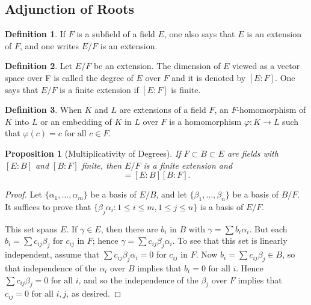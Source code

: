 \documentclass[draft]{article}
\newtheorem{prop}[thm]{Proposition}
\theoremstyle{definition}
\newtheorem{defn}{Definition}[section]
\theoremstyle{remark}
\begin{document}
		\subsection{Adjunction of Roots}
		
			\begin{defn}
				If $F$ is a subfield of a field $E$, one also says that $E$ is an extension of $F$, and one writes $E/F$ is an extension.
			\end{defn}
			
			\begin{defn}
				Let $E/F$ be an extension. The dimension of $E$ viewed as a vector space over F is called the degree of $E$ over $F$ and it is denoted by $[E : F]$. One says that $E/F$ is a finite extension if $[E : F]$ is finite.
			\end{defn}
			
			\begin{defn}
			    When $K$ and $L$ are extensions of a field $F$, an $F$-homomorphism of $K$ into $L$ or an embedding of $K$ in $L$ over $F$ is a homomorphism $\varphi: K \to L$ such that $\varphi(c) = c \text{ for all } c \in F$. 
			\end{defn}
			
			\begin{prop}[Multiplicativity of Degrees]
				If $F \subset B \subset E$ are fields with $[E : B]$ and $[B : F]$ finite, then $E/F$ is a finite extension and
				\begin{equation*}
					[E : F] = [E : B][B : F].
				\end{equation*}
			\end{prop}
			
			\begin{proof}
				Let $\{\alpha_1, \dots, \alpha_m\}$ be a basis of $E/B$, and let $\{\beta_1, \dots, \beta_n\}$ be a basis of $B/F$. It suffices to prove that $\{\beta_j\alpha_i : 1 \leq i \leq m, 1 \leq j \leq n\}$ is a basis of $E/F$.\par
				This set spans $E$. If $\gamma \in E$, then there are $b_i$ in $B$ with $\gamma = \sum{b_i\alpha_i}$. But each $b_i = \sum{c_{ij}\beta_j}$ for $c_{ij}$ in $F$; hence $\gamma = \sum{c_{ij}\beta_j\alpha_i}$. To see that this set is linearly independent, assume that $\sum{c_{ij}\beta_j\alpha_i} = 0$ for $c_{ij}$ in $F$. Now $b_i = \sum{c_{ij}\beta_j} \in B$, so that independence of the $\alpha_i$ over $B$ implies that $b_i = 0 \text{ for all } i$. Hence $\sum{c_{ij}\beta_j} = 0 \text{ for all } i$, and so the independence of the $\beta_j$ over $F$ implies that $c_{ij} = 0 \text{ for all } i, j$, as desired.
			\end{proof}
			
\end{document}
